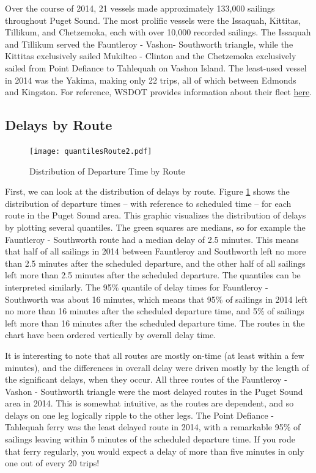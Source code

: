 \documentclass[11pt, letterpaper]{article}
\begin{document}
Over the course of 2014, 21 vessels made approximately 133,000 sailings throughout Puget Sound. The most prolific vessels were the Issaquah, Kittitas, Tillikum, and Chetzemoka, each with over 10,000 recorded sailings. The Issaquah and Tillikum served the Fauntleroy - Vashon- Southworth triangle, while the Kittitas exclusively sailed Mukilteo - Clinton and the Chetzemoka exclusively sailed from Point Defiance to Tahlequah on Vashon Island. The least-used vessel in 2014 was the Yakima, making only 22 trips, all of which between Edmonds and Kingston. For reference, WSDOT provides information about their fleet {\color{blue}\href{http://www.wsdot.wa.gov/ferries/vesselwatch/Vessels.aspx}{here}}.




\subsection*{Delays by Route}

\begin{figure}[htbp]
\begin{center}
\texttt{[image: quantilesRoute2.pdf]}
\caption{Distribution of Departure Time by Route}
\label{route1}
\end{center}
\end{figure}


First, we can look at the distribution of delays by route. Figure \ref{route1} shows the distribution of departure times -- with reference to scheduled time -- for each route in the Puget Sound area. This graphic visualizes the distribution of delays by plotting several quantiles. The green squares are medians, so for example the Fauntleroy - Southworth route had a median delay of 2.5 minutes. This means that half of all sailings in 2014 between Fauntleroy and Southworth left no more than 2.5 minutes after the scheduled departure, and the other half of all sailings left more than 2.5 minutes after the scheduled departure. The quantiles can be interpreted similarly. The 95\% quantile of delay times for Fauntleroy - Southworth was about 16 minutes, which means that 95\% of sailings in 2014 left no more than 16 minutes after the scheduled departure time, and 5\% of sailings left more than 16 minutes after the scheduled departure time. The routes in the chart have been ordered vertically by overall delay time.

It is interesting to note that all routes are mostly on-time (at least within a few minutes), and the differences in overall delay were driven mostly by the length of the significant delays, when they occur. All three routes of the Fauntleroy - Vashon - Southworth triangle were the most delayed routes in the Puget Sound area in 2014. This is somewhat intuitive, as the routes are dependent, and so delays on one leg logically ripple to the other legs. The Point Defiance - Tahlequah ferry was the least delayed route in 2014, with a remarkable 95\% of sailings leaving within 5 minutes of the scheduled departure time. If you rode that ferry regularly, you would expect a delay of more than five minutes in only one out of every 20 trips! 
\end{document}
